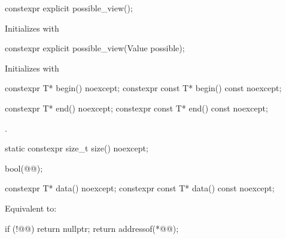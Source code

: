 \begin{itemdecl}
constexpr explicit possible_view();
\end{itemdecl}
\begin{itemdescr}
\pnum{}
\effects{}
Initializes  with 
\end{itemdescr}

\begin{itemdecl}
constexpr explicit possible_view(Value possible);
\end{itemdecl}
\begin{itemdescr}
\pnum{}
\effects{}
Initializes  with 
\end{itemdescr}

\begin{itemdecl}
constexpr T* begin() noexcept;
constexpr const T* begin() const noexcept;
\end{itemdecl}

\begin{itemdescr}
\pnum
\returns
{}
\end{itemdescr}

\begin{itemdecl}
constexpr T* end() noexcept;
constexpr const T* end() const noexcept;
\end{itemdecl}

\begin{itemdescr}
\pnum{}
\returns {}.
\end{itemdescr}

\begin{itemdecl}
static constexpr size_t size() noexcept;
\end{itemdecl}

\begin{itemdescr}
\pnum{}
\returns
\begin{codeblock}
bool(@@);
\end{codeblock}
\end{itemdescr}

\begin{itemdecl}
constexpr T* data() noexcept;
constexpr const T* data() const noexcept;
\end{itemdecl}

\begin{itemdescr}
\pnum{}
\effects{}
Equivalent to:

\begin{codeblock}
if (!@@)
    return nullptr;
return addressof(*@@);

\end{codeblock}
\end{itemdescr}

